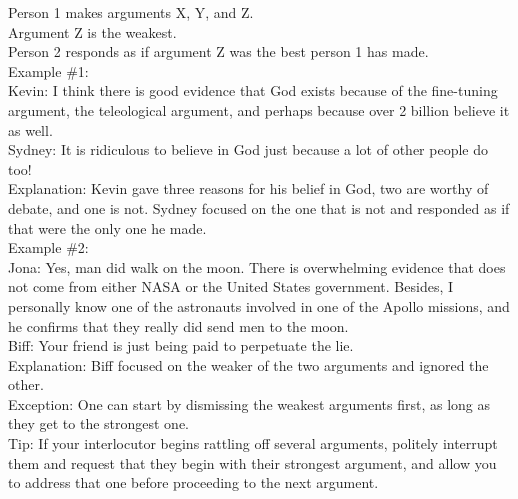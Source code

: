 \documentclass[a4paper,12pt,single,pdftex]{scrartcl}
\begin{document}
    
      Person 1 makes arguments X, Y, and Z.
    \\

    
      Argument Z is the weakest.
    \\

    
      Person 2 responds as if argument Z was the best person 1 has made.
    \\

    
      Example \#1:
    \\

    
      Kevin: I think there is good evidence that God exists because of the fine-tuning argument, the teleological argument, and perhaps because over 2 billion believe it as well.
    \\

    
      Sydney: It is ridiculous to believe in God just because a lot of other people do too!
    \\

    
      Explanation: Kevin gave three reasons for his belief in God, two are worthy of debate, and one is not. Sydney focused on the one that is not and responded as if that were the only one he made.
    \\

    
      Example \#2:
    \\

    
      Jona: Yes, man did walk on the moon. There is overwhelming evidence that does not come from either NASA or the United States government. Besides, I personally know one of the astronauts involved in one of the Apollo missions, and he confirms that they really did send men to the moon.
    \\

    
      Biff: Your friend is just being paid to perpetuate the lie.
    \\

    
      Explanation: Biff focused on the weaker of the two arguments and ignored the other.
    \\

    
      Exception: One can start by dismissing the weakest arguments first, as long as they get to the strongest one.
    \\

    
      Tip: If your interlocutor begins rattling off several arguments,  politely interrupt them and request that they begin with their strongest argument, and allow you to address that one before proceeding to the next argument.
    \\
\end{document}
